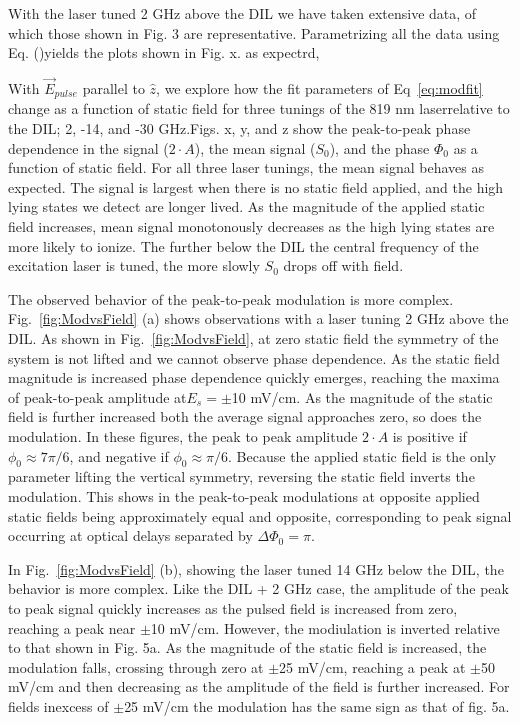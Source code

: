 \documentclass[aps,pra,preprint,groupedaddress]{revtex4-1}
\begin{document}
With the laser tuned 2 GHz above the DIL we have taken extensive data, of which those shown in Fig. 3 are representative. Parametrizing all the data using Eq. ()yields the plots shown in Fig. x. as expectrd, 

With $\vec{E}_{pulse}$ parallel to $\hat{z}$, we explore how the fit parameters of Eq~\ref{eq:modfit} change as a function of static field for three tunings of the 819 nm laserrelative to the DIL; 2, -14, and -30 GHz.Figs. x, y, and z show the peak-to-peak phase dependence in the signal ($2\cdot A$), the mean signal ($S_0$), and the phase $\Phi_0$ as a function of static field. For all three laser tunings, the mean signal behaves as expected. The signal is largest when there is no static field applied, and the high lying states we detect are longer lived. As the magnitude of the applied static field increases, mean signal monotonously decreases as the high lying states are more likely to ionize. The further below the DIL the central frequency of the excitation laser is tuned, the more slowly $S_0$ drops off with field.

The observed behavior of the peak-to-peak modulation is more complex. Fig.~\ref{fig:ModvsField} (a) shows observations with a laser tuning 2 GHz above the DIL. As shown in Fig.~\ref{fig:ModvsField}, at zero static field the symmetry of the system is not lifted and we cannot observe phase dependence. As the static field magnitude is increased phase dependence quickly emerges, reaching the maxima of peak-to-peak amplitude at$E_s=\pm$10 mV/cm. As the magnitude of the static field is further increased both the average signal approaches zero, so does the modulation. In these figures, the peak to peak amplitude $2 \cdot A$ is positive if $\phi_0 \approx 7\pi/6$, and negative if $\phi_0 \approx \pi/6$. Because the applied static field is the only parameter lifting the vertical symmetry, reversing the static field inverts the modulation. This shows in the peak-to-peak modulations at opposite applied static fields being approximately equal and opposite, corresponding to peak signal occurring at optical delays separated by $\Delta \Phi_0 = \pi$.

In Fig.~\ref{fig:ModvsField} (b), showing the laser tuned 14 GHz below the DIL, the behavior is more complex. Like the DIL + 2 GHz case, the amplitude of the peak to peak signal quickly increases as the pulsed field is increased from zero, reaching a peak near $\pm$10 mV/cm. However, the modiulation is inverted relative to that shown in Fig. 5a. As the magnitude of the static field is increased, the modulation falls, crossing through zero at $\pm$25 mV/cm, reaching a peak at $\pm$50 mV/cm and then decreasing as the amplitude of the field is further increased. For fields inexcess of $\pm$25 mV/cm the modulation has the same sign as that of fig. 5a.
\end{document}
